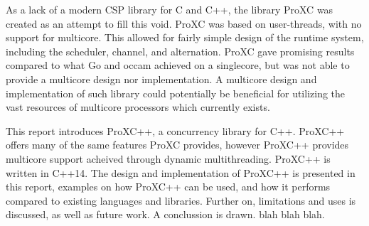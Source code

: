 As a lack of a modern CSP library for C and C++, the library ProXC was created as an attempt to fill this void. ProXC was based on user-threads, with no support for multicore. This allowed for fairly simple design of the runtime system, including the scheduler, channel, and alternation. ProXC gave promising results compared to what Go and occam achieved on a singlecore, but was not able to provide a multicore design nor implementation. A multicore design and implementation of such library could potentially be beneficial for utilizing the vast resources of multicore processors which currently exists. 

This report introduces ProXC++, a concurrency library for C++. ProXC++ offers many of the same features ProXC provides, however ProXC++ provides multicore support acheived through dynamic multithreading. ProXC++ is written in C++14. The design and implementation of ProXC++ is presented in this report, examples on how ProXC++ can be used, and how it performs compared to existing languages and libraries. Further on, limitations and uses is discussed, as well as future work. A conclussion is drawn.  blah blah blah.
